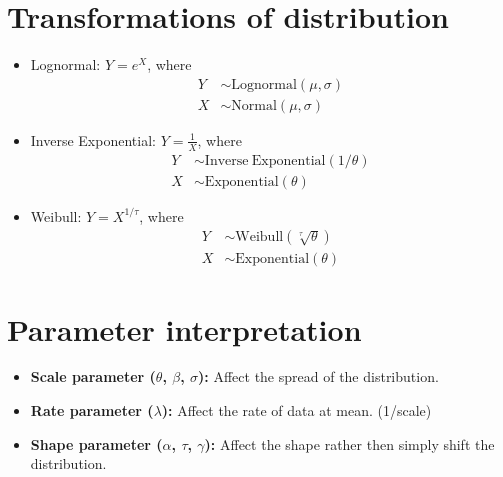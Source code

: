 \documentclass[10pt, french]{article}
\begin{document}
\begin{multicols*}{3}
\section*{Transformations of distribution}
\label{Appendix: Transformations distribution}
\begin{itemize}[align=left,leftmargin=*]
    \item Lognormal: $Y = e^{X}$, where
    \begin{align*}
        Y &\sim \mathrm{Lognormal}(\mu, \sigma) \\
        X &\sim \mathrm{Normal}(\mu, \sigma)
    \end{align*}
    \item Inverse Exponential: $Y = \frac{1}{X}$, where
    \begin{align*}
        Y &\sim \mathrm{Inverse\:Exponential}(1/\theta) \\
        X &\sim \mathrm{Exponential}(\theta)
    \end{align*}
    \item Weibull: $Y = X^{1/\tau}$, where
    \begin{align*}
        Y &\sim \mathrm{Weibull}(\sqrt[\tau]{\theta}) \\
        X &\sim \mathrm{Exponential}(\theta)
    \end{align*}
\end{itemize}

\section*{Parameter interpretation}
\begin{itemize}[align=left,leftmargin=*]
    \item \textbf{Scale parameter ($\theta$, $\beta$, $\sigma$):} Affect the spread of the distribution.
    \item \textbf{Rate parameter ($\lambda$):} Affect the rate of data at mean. (1/scale)
    \item \textbf{Shape parameter ($\alpha$, $\tau$, $\gamma$):} Affect the shape rather then simply shift the distribution.
\end{itemize}

\end{multicols*}
\end{document}
